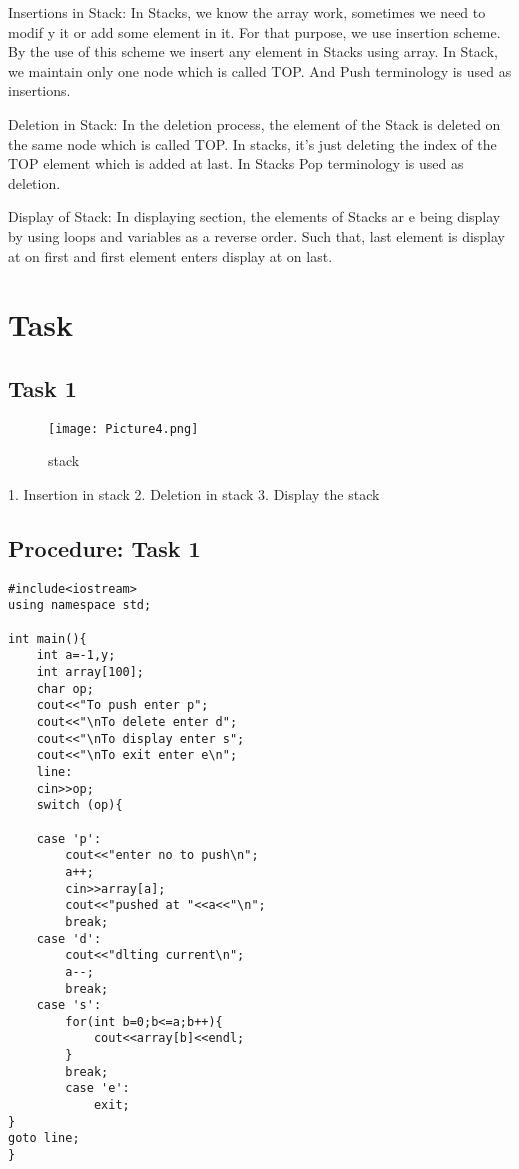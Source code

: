 \documentclass[11pt]{article}            %
\begin{document}
Insertions in Stack: 
In Stacks, we know the array work, sometimes we need to modif y it or add some element in it. For 
that purpose, we use insertion scheme. By the use of this scheme we insert any element in Stacks 
using array. In Stack, we maintain only one node which is called TOP. And Push terminology is 
used as insertions.   
 
Deletion in Stack: 
In the deletion process, the element of the Stack is deleted on the same node which is called TOP. 
In stacks, it’s just deleting the index of the TOP element which is added at last. In Stacks Pop 
terminology is used as deletion.   
 
Display of Stack: 
In displaying section, the elements of Stacks ar e being display by using loops and variables as a 
reverse order. Such that, last element is display at on first and first element enters display at on 
last. 
 


\section{Task}  
\subsection{ Task 1 }     

\begin{figure*}
\centering
  \texttt{[image: Picture4.png]}
\caption{stack}
\label{Figure:3}    
\end{figure*}
1.  Insertion in stack  
2.  Deletion in stack 
3.  Display the stack 
\subsection{Procedure: Task 1 }     

\begin{lstlisting}
#include<iostream>
using namespace std;

int main(){
	int a=-1,y;
	int array[100];
	char op;
	cout<<"To push enter p";
	cout<<"\nTo delete enter d";
	cout<<"\nTo display enter s";
	cout<<"\nTo exit enter e\n";
	line:
	cin>>op;
	switch (op){
	
	case 'p':
		cout<<"enter no to push\n";
		a++;
		cin>>array[a];
		cout<<"pushed at "<<a<<"\n";
		break;
	case 'd':
		cout<<"dlting current\n";
		a--;
		break;
	case 's':
		for(int b=0;b<=a;b++){
			cout<<array[b]<<endl;
		}
		break;
		case 'e':
			exit;
}
goto line;
}


\end{lstlisting}

 
\end{document}
